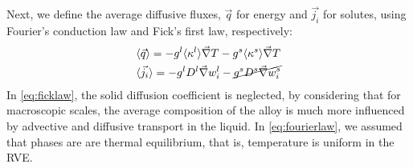 Next, we define the average diffusive fluxes, $\vec{q}$ for energy and $\vec{j_i}$ for solutes, using Fourier's conduction law and Fick's first law, respectively:
\begin{align}
\label{eq:fourierlaw}
& \langle \vec{q} \rangle = - {g^l} \langle \kappa^l \rangle \vec{\nabla} T -  {g^s} \langle \kappa^s \rangle \vec{\nabla} T 	\\
\label{eq:ficklaw}
& \langle \vec{j_i} \rangle = - {g^l} D^l \vec{\nabla} w_i^l - \cancel{{g^s} D^s \vec{\nabla} w_i^s}
\end{align}
In \cref{eq:ficklaw}, the solid diffusion coefficient is neglected, 
by considering that for macroscopic scales, the average composition of the alloy is much more influenced by advective 
and diffusive transport in the liquid.
In \cref{eq:fourierlaw}, we assumed that phases are are thermal equilibrium, that is, temperature is uniform in the RVE.

